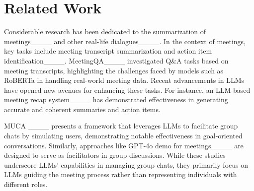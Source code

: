 \section{Related Work}
 Considerable research has been dedicated to the summarization of meetings____ and other real-life dialogues____. In the context of meetings, key tasks include meeting transcript summarization and action item identification____. MeetingQA____ investigated Q\&A tasks based on meeting transcripts, highlighting the challenges faced by models such as RoBERTa in handling real-world meeting data. Recent advancements in LLMs have opened new avenues for enhancing these tasks. For instance, an LLM-based meeting recap system____ has demonstrated effectiveness in generating accurate and coherent summaries and action items.



 MUCA ____ presents a framework that leverages LLMs to facilitate group chats by simulating users, demonstrating notable effectiveness in goal-oriented conversations. Similarly, approaches like GPT-4o demo for meetings____ are designed to serve as facilitators in group discussions. While these studies underscore LLMs’ capabilities in managing group chats, they primarily focus on LLMs guiding the meeting process rather than representing individuals with different roles.

